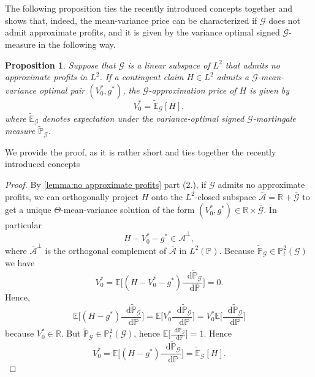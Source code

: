 \documentclass[11pt,a4paper,twoside,openany]{report}
\newcommand{\diff}{\mathop{}\!\mathrm{d}}
\theoremstyle{plain} %
\newtheorem{proposition}[proposition]{Proposition}
\theoremstyle{definition} %
\theoremstyle{remark} %
\begin{document}
\\\\
The following proposition ties the recently introduced concepts together and shows that, indeed, the mean-variance price can be characterized if \(\mathcal{G}\) does not admit approximate profits, and it is given by the variance optimal signed \(\mathcal{G}\)-measure in the following way.
\begin{proposition}\label{prop:mean variance price}
Suppose that $\mathcal{G}$ is a linear subspace of $L^2$ that admits no
approximate profits in $L^2$. If a contingent claim $H\in L^2$ admits a
$\mathcal{G}$-mean-variance optimal pair $(V_0^*,g^*)$, the
$\mathcal{G}$-approximation price of $H$ is given by
\[
V_0^*=\widetilde{\mathbb{E}}_{\mathcal{G}}[H],
\]
where $\widetilde{\mathbb{E}}_{\mathcal{G}}$ denotes expectation under the variance-optimal
signed $\mathcal{G}$-martingale measure $\widetilde{\mathbb{P}}_{\mathcal{G}}$.
\end{proposition}
We provide the proof, as it is rather short and ties together the recently introduced concepts
\begin{proof}
    By \cref{lemma:no approximate profits} part (2.), if \(\mathcal{G}\) admits no approximate profits, we can orthogonally project \(H\) onto the \(L^2\)-closed subspace \(\overline{\mathcal{A}}=\mathbb{R}+\overline{\mathcal{G}}
    \) to get a unique \(\Theta\)-mean-variance solution of the form \((V_0^*,g^*)\in \mathbb{R}\times\overline{\mathcal{G}}\). In particular
    \begin{equation}
        H-V_0^*-g^*\in\overline{\mathcal{A}}^{\perp},
    \end{equation}
    where \(\overline{\mathcal{A}}^{\perp}\) is the orthogonal complement of \(\overline{\mathcal{A}}\) in \(L^2(\mathbb{P})\). Because \(\widetilde{\mathbb{P}}_{\mathcal{G}}\in\mathbb{P}^2_t(\mathcal{G})\) we have 
    \begin{equation}
        V_0^*=\mathbb{E}\bigg[(H-V_0^*-g^*)\frac{\diff \widetilde{\mathbb{P}}_{\mathcal{G}}}{\diff \mathbb{P}}\bigg]=0.
    \end{equation}
    Hence, 
    \begin{equation}
        \mathbb{E}\bigg[(H-g^*)\frac{\diff \widetilde{\mathbb{P}}_{\mathcal{G}}}{\diff \mathbb{P}}\bigg]=\mathbb{E}\bigg[V_0^*\frac{\diff \widetilde{\mathbb{P}}_{\mathcal{G}}}{\diff \mathbb{P}}\bigg]=V_0^*\mathbb{E}\bigg[\frac{\diff \widetilde{\mathbb{P}}_{\mathcal{G}}}{\diff \mathbb{P}}\bigg]
    \end{equation}
    because \(V_0^*\in\mathbb{R}\). But \(\widetilde{\mathbb{P}}_{\mathcal{G}}\in\mathbb{P}^2_t(\mathcal{G})\), hence \(\mathbb{E}\bigg[\frac{\diff\widetilde{\mathbb{P}}_{\mathcal{G}}}{\diff \mathbb{P}}\bigg]=1\).  Hence 
    \begin{equation}
        V_0^*=\mathbb{E}\bigg[(H-g^*)\frac{\diff\widetilde{\mathbb{P}}_{\mathcal{G}}}{\diff \mathbb{P}}\bigg]=\widetilde{\mathbb{E}}_{\mathcal{G}}[H].
    \end{equation}
\end{proof}
\end{document}
